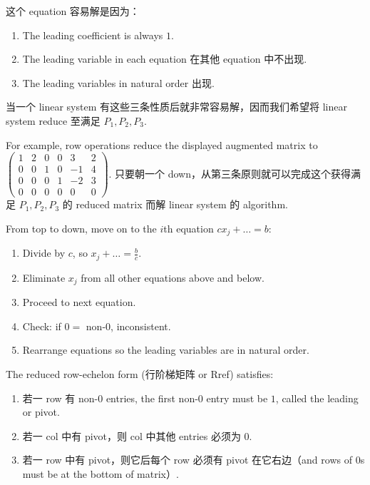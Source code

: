 这个 equation 容易解是因为：

\begin{enumerate}
\tightlist
\item
  The leading coefficient is always \(1\).
\item
  The leading variable in each equation 在其他 equation 中不出现.
\item
  The leading variables in natural order 出现.
\end{enumerate}

当一个 linear system 有这些三条性质后就非常容易解，因而我们希望将 linear system reduce 至满足 \(P_{1},P_{2},P_{3}\).

For example, row operations reduce the displayed augmented matrix to \(\begin{pmatrix}
1 & 2 & 0 & 0 & 3 & 2 \\
0 & 0 & 1 & 0 & {- 1} & 4 \\
0 & 0 & 0 & 1 & {- 2} & 3 \\
0 & 0 & 0 & 0 & 0 & 0
\end{pmatrix}\). 只要朝一个 down，从第三条原则就可以完成这个获得满足 \(P_{1},P_{2},P_{3}\) 的 reduced matrix 而解 linear system 的 algorithm.

From top to down, move on to the \(i\)th equation \(cx_{j} + \ldots = b\):

\begin{enumerate}
\tightlist
\item
  Divide by \(c\), so \(x_{j} + \ldots = \frac{b}{c}\).
\item
  Eliminate \(x_{j}\) from all other equations above and below.
\item
  Proceed to next equation.
\item
  Check: if \(0 =\) non-\(0\), inconsistent.
\item
  Rearrange equations so the leading variables are in natural order.
\end{enumerate}

The reduced row-echelon form (行阶梯矩阵 or Rref) satisfies:

\begin{enumerate}
\tightlist
\item
  若一 row 有 non-\(0\) entries, the first non-\(0\) entry must be \(1\), called the leading or pivot.
\item
  若一 col 中有 pivot，则 col 中其他 entries 必须为 \(0\).
\item
  若一 row 中有 pivot，则它后每个 row 必须有 pivot 在它右边（and rows of \(0\)s must be at the bottom of matrix）.
\end{enumerate}

